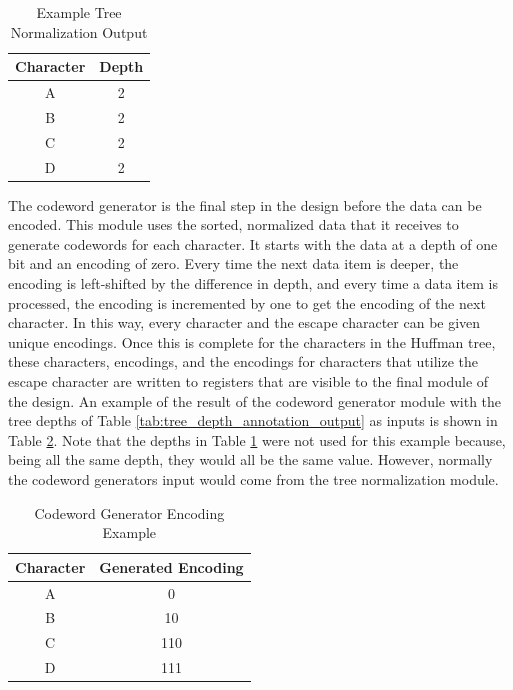 \documentclass[doublespace,nopageskip]{VTthesis}
\begin{document}
\begin{table}[htb]
	\centering
	\caption{Example Tree Normalization Output}
	\begin{tabular}{cc}
	    \toprule
	    Character & Depth \\
	    \midrule
	    A & 2 \\
	    \midrule
	    B & 2 \\
	    \midrule
	    C & 2 \\
	    \midrule
	    D & 2 \\
	    \bottomrule
	\end{tabular}
	\label{tab:tree_normalization_output}
\end{table}

The codeword generator is the final step in the design before the data can be encoded. This module uses the sorted, normalized data that it receives to generate codewords for each character. It starts with the data at a depth of one bit and an encoding of zero. Every time the next data item is deeper, the encoding is left-shifted by the difference in depth, and every time a data item is processed, the encoding is incremented by one to get the encoding of the next character. In this way, every character and the escape character can be given unique encodings. Once this is complete for the characters in the Huffman tree, these characters, encodings, and the encodings for characters that utilize the escape character are written to registers that are visible to the final module of the design. An example of the result of the codeword generator module with the tree depths of Table \ref{tab:tree_depth_annotation_output} as inputs is shown in Table \ref{tab:codeword_generator_encodings}. Note that the depths in Table \ref{tab:tree_normalization_output} were not used for this example because, being all the same depth, they would all be the same value. However, normally the codeword generators input would come from the tree normalization module.

\begin{table}[htb]
	\centering
	\caption{Codeword Generator Encoding Example}
	\begin{tabular}{cc}
	    \toprule
	    Character & Generated Encoding\\
	    \midrule
	    A & 0 \\
	    \midrule
	    B & 10 \\
	    \midrule
	    C & 110 \\
	    \midrule
	    D & 111 \\
	    \bottomrule
	\end{tabular}
	\label{tab:codeword_generator_encodings}
\end{table}
\end{document}
